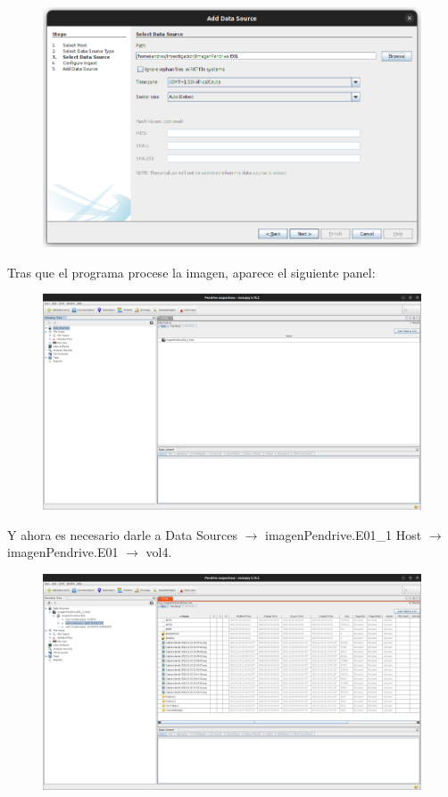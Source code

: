 \documentclass{article}
\begin{document}
\begin{figure}[H]
    \centering
    \includegraphics[width=\textwidth]{imagenes/Captura desde 2022-12-03 21-45-13.png}
\end{figure}

Tras que el programa procese la imagen, aparece el siguiente panel:

\begin{figure}[H]
    \centering
    \includegraphics[width=\textwidth]{imagenes/Captura desde 2022-12-03 21-46-02.png}
\end{figure}

Y ahora es necesario darle a Data Sources $\rightarrow$ imagenPendrive.E01\_1 Host $\rightarrow$ imagenPendrive.E01 $\rightarrow$ vol4.

\begin{figure}[H]
    \centering
    \includegraphics[width=\textwidth]{imagenes/Captura desde 2022-12-03 21-47-44.png}
\end{figure}
\end{document}
